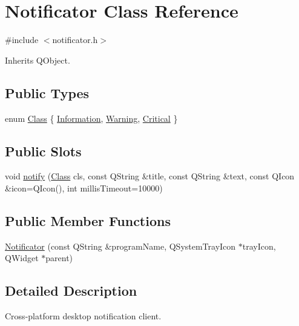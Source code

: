 \hypertarget{class_notificator}{}\section{Notificator Class Reference}
\label{class_notificator}


{\ttfamily \#include $<$notificator.\+h$>$}



Inherits Q\+Object.

\subsection*{Public Types}
\begin{DoxyCompactItemize}
\item 
enum \mbox{\hyperlink{class_notificator_aa2ff8a05d471e32e77584a2b8dd182ab}{Class}} \{ \mbox{\hyperlink{class_notificator_aa2ff8a05d471e32e77584a2b8dd182aba195b01e918cc724c6ad65f5037e85f83}{Information}}, 
\mbox{\hyperlink{class_notificator_aa2ff8a05d471e32e77584a2b8dd182abac33ad19811d3b1d6b57305dd75d63a5e}{Warning}}, 
\mbox{\hyperlink{class_notificator_aa2ff8a05d471e32e77584a2b8dd182aba596518f9cfdbd57b0fdc68fc95c69ecd}{Critical}}
 \}
\end{DoxyCompactItemize}
\subsection*{Public Slots}
\begin{DoxyCompactItemize}
\item 
void \mbox{\hyperlink{class_notificator_ae08e1e7e85ddc4690f307649021f7fdc}{notify}} (\mbox{\hyperlink{class_notificator_aa2ff8a05d471e32e77584a2b8dd182ab}{Class}} cls, const Q\+String \&title, const Q\+String \&text, const Q\+Icon \&icon=Q\+Icon(), int millis\+Timeout=10000)
\end{DoxyCompactItemize}
\subsection*{Public Member Functions}
\begin{DoxyCompactItemize}
\item 
\mbox{\hyperlink{class_notificator_ac98c8b73d4e06ea85e9f58426c5c935d}{Notificator}} (const Q\+String \&program\+Name, Q\+System\+Tray\+Icon $\ast$tray\+Icon, Q\+Widget $\ast$parent)
\end{DoxyCompactItemize}


\subsection{Detailed Description}
Cross-\/platform desktop notification client. 

